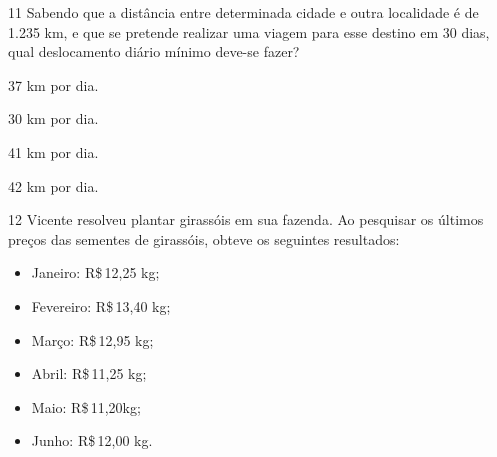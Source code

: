 







\num{11} Sabendo que a distância entre determinada cidade e outra localidade é de
1.235 km, e que se pretende realizar uma viagem para esse destino em 30
dias, qual deslocamento diário mínimo deve-se fazer?

\begin{escolha}
\item 37 km por dia.
\item 30 km por dia.
\item 41 km por dia.
\item 42 km por dia.
\end{escolha}







\pagebreak

\num{12} Vicente resolveu plantar girassóis em sua fazenda. Ao pesquisar os
últimos preços das sementes de girassóis, obteve os seguintes
resultados:

\begin{itemize}
\item Janeiro: R\$\,12,25 kg;
\item Fevereiro: R\$\,13,40 kg;
\item Março: R\$\,12,95 kg;
\item Abril: R\$\,11,25 kg;
\item Maio: R\$\,11,20kg;
\item Junho: R\$\,12,00 kg.
\end{itemize}

